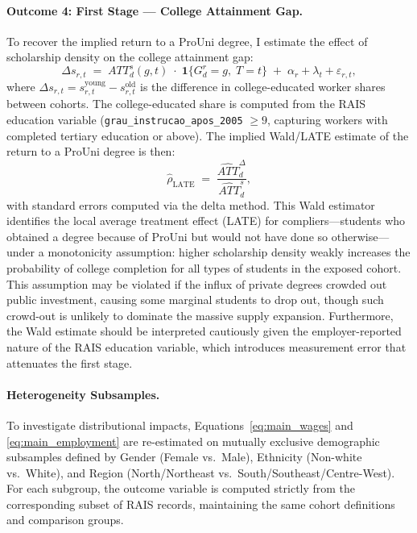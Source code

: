\paragraph{Outcome 4: First Stage --- College Attainment Gap.}
To recover the implied return to a ProUni degree, I estimate the effect of scholarship density on the college attainment gap:
\begin{equation}
    \Delta s_{r,t}
    \;=\;
    ATT_d^{s}(g, t)
    \;\cdot\;
    \mathbf{1}\{G_d^r = g,\; T = t\}
    \;+\;
    \alpha_r + \lambda_t + \varepsilon_{r,t},
    \label{eq:first_stage}
\end{equation}
where $\Delta s_{r,t} = s_{r,t}^{\text{young}} - s_{r,t}^{\text{old}}$ is the difference in college-educated worker shares between cohorts. The college-educated share is computed from the RAIS education variable (\texttt{grau\_instrucao\_apos\_2005} $\geq 9$, capturing workers with completed tertiary education or above). The implied Wald/LATE estimate of the return to a ProUni degree is then:
\begin{equation}
    \hat{\rho}_{\text{LATE}}
    \;=\;
    \frac{\widehat{ATT}_d^{\Delta}}{\widehat{ATT}_d^{s}},
    \label{eq:wald}
\end{equation}
with standard errors computed via the delta method. This Wald estimator identifies the local average treatment effect (LATE) for compliers---students who obtained a degree because of ProUni but would not have done so otherwise---under a monotonicity assumption: higher scholarship density weakly increases the probability of college completion for all types of students in the exposed cohort. This assumption may be violated if the influx of private degrees crowded out public investment, causing some marginal students to drop out, though such crowd-out is unlikely to dominate the massive supply expansion. Furthermore, the Wald estimate should be interpreted cautiously given the employer-reported nature of the RAIS education variable, which introduces measurement error that attenuates the first stage.


\paragraph{Heterogeneity Subsamples.}
To investigate distributional impacts, Equations~\ref{eq:main_wages} and \ref{eq:main_employment} are re-estimated on mutually exclusive demographic subsamples defined by Gender (Female vs.\ Male), Ethnicity (Non-white vs.\ White), and Region (North/Northeast vs.\ South/Southeast/Centre-West). For each subgroup, the outcome variable is computed strictly from the corresponding subset of RAIS records, maintaining the same cohort definitions and comparison groups.


